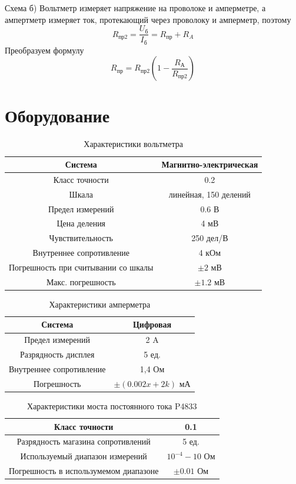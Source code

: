 \documentclass[a4paper,12pt]{article}
\begin{document}
Схема б) Вольтметр измеряет напряжение на проволоке и амперметре, а ампертметр измеряет ток, протекающий через проволоку и амперметр, поэтому
\begin{equation}
R_{\mbox{пр2}}=\frac{U_{\mbox{б}}}{I_{\mbox{б}}} = R_{\mbox{пр}}+R_A
\end{equation}
Преобразуем формулу
\begin{equation}
R_{\mbox{пр}}=R_{\mbox{пр2}} \left( 1-\frac{R_{\mbox{А}}}{R_{\mbox{пр2}}} \right)
\end{equation}

\section{Оборудование}

\begin{table}[H]
\centering
\caption{Характеристики вольтметра}
\begin{tabular}{|c|c|}
\hline
Система & Магнитно-электрическая \\
\hline
Класс точности & 0.2 \\
\hline
Шкала & линейная, 150 делений  \\
\hline
Предел измерений & 0.6 В \\
\hline
Цена деления & 4 мВ \\
\hline
Чувствительность & 250 дел/В \\
\hline
Внутреннее сопротивление & 4 кОм \\
\hline
Погрешность при считывании со шкалы & $\pm 2$ мВ \\
\hline
Макс. погрешность & $\pm1.2$ мВ \\
\hline
\end{tabular}
\end{table}

\begin{table}[H]
\centering
\caption{Характеристики амперметра}
\begin{tabular}{|c|c|}
\hline
Система & Цифровая \\
\hline
Предел измерений & 2 A \\
\hline
Разрядность дисплея & 5 ед. \\
\hline
Внутреннее сопротивление & 1,4 Ом \\
\hline
Погрешность & $\pm (0.002x+2k)$ мА \\
\hline
\end{tabular}
\end{table}

\begin{table}[H]
\centering
\caption{Характеристики моста постоянного тока P4833}
\begin{tabular}{|c|c|}
\hline
Класс точности & 0.1 \\
\hline
Разрядность магазина сопротивлений & 5 ед. \\
\hline
Используемый диапазон измерений & $10^{-4} - 10$ Ом \\
\hline
Погрешность в использумемом диапазоне & $\pm 0.01$ Ом \\
\hline
\end{tabular}
\end{table}
\end{document}
